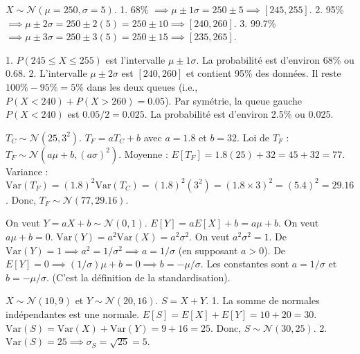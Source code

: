 
\begin{correctionbox}
$X \sim \mathcal{N}(\mu=250, \sigma=5)$.
1.  68\% $\implies \mu \pm 1\sigma = 250 \pm 5 \implies [245, 255]$.
2.  95\% $\implies \mu \pm 2\sigma = 250 \pm 2(5) = 250 \pm 10 \implies [240, 260]$.
3.  99.7\% $\implies \mu \pm 3\sigma = 250 \pm 3(5) = 250 \pm 15 \implies [235, 265]$.
\end{correctionbox}

\begin{correctionbox}
1.  $P(245 \le X \le 255)$ est l'intervalle $\mu \pm 1\sigma$.
    La probabilité est d'environ 68\% ou 0.68.
2.  L'intervalle $\mu \pm 2\sigma$ est $[240, 260]$ et contient 95\% des données.
    Il reste $100\% - 95\% = 5\%$ dans les deux queues (i.e., $P(X < 240) + P(X > 260) = 0.05$).
    Par symétrie, la queue gauche $P(X < 240)$ est $0.05 / 2 = 0.025$.
    La probabilité est d'environ 2.5\% ou 0.025.
\end{correctionbox}


\begin{correctionbox}
$T_C \sim \mathcal{N}(25, 3^2)$. $T_F = a T_C + b$ avec $a=1.8$ et $b=32$.
Loi de $T_F$ : $T_F \sim \mathcal{N}(a\mu + b, (a\sigma)^2)$.
Moyenne : $E[T_F] = 1.8(25) + 32 = 45 + 32 = 77$.
Variance : $\text{Var}(T_F) = (1.8)^2 \text{Var}(T_C) = (1.8)^2 (3^2) = (1.8 \times 3)^2 = (5.4)^2 = 29.16$.
Donc, $T_F \sim \mathcal{N}(77, 29.16)$.
\end{correctionbox}

\begin{correctionbox}
On veut $Y = aX+b \sim \mathcal{N}(0, 1)$.
$E[Y] = aE[X] + b = a\mu + b$. On veut $a\mu + b = 0$.
$\text{Var}(Y) = a^2 \text{Var}(X) = a^2 \sigma^2$. On veut $a^2 \sigma^2 = 1$.
De $\text{Var}(Y)=1 \implies a^2 = 1/\sigma^2 \implies a = 1/\sigma$ (en supposant $a>0$).
De $E[Y]=0 \implies (1/\sigma)\mu + b = 0 \implies b = -\mu/\sigma$.
Les constantes sont $a = 1/\sigma$ et $b = -\mu/\sigma$. (C'est la définition de la standardisation).
\end{correctionbox}

\begin{correctionbox}
$X \sim \mathcal{N}(10, 9)$ et $Y \sim \mathcal{N}(20, 16)$. $S = X+Y$.
1.  La somme de normales indépendantes est une normale.
    $E[S] = E[X] + E[Y] = 10 + 20 = 30$.
    $\text{Var}(S) = \text{Var}(X) + \text{Var}(Y) = 9 + 16 = 25$.
    Donc, $S \sim \mathcal{N}(30, 25)$.
2.  $\text{Var}(S) = 25 \implies \sigma_S = \sqrt{25} = 5$.
\end{correctionbox}

